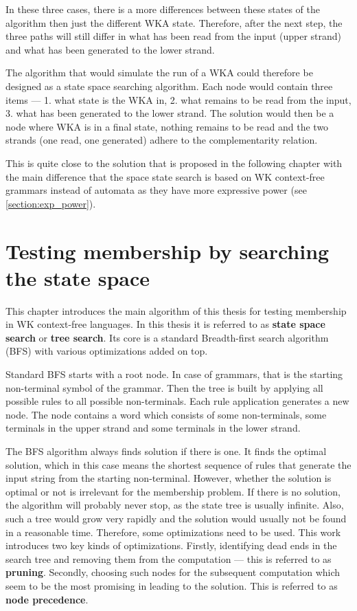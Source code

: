 In these three cases, there is a more differences between these states of the algorithm then just the different WKA state. Therefore, after the next step, the three paths will still differ in what has been read from the input (upper strand) and what has been generated to the lower strand.

The algorithm that would simulate the run of a WKA could therefore be designed as a state space searching algorithm. Each node would contain three items --- 1. what state is the WKA in, 2. what remains to be read from the input, 3. what has been generated to the lower strand. The solution would then be a node where WKA is in a final state, nothing remains to be read and the two strands (one read, one generated) adhere to the complementarity relation.

This is quite close to the solution that is proposed in the following chapter with the main difference that the space state search is based on WK context-free grammars instead of automata as they have more expressive power (see \ref{section:exp_power}).

\chapter{Testing membership by searching the state space} \label{chapter:parse_tree}
This chapter introduces the main algorithm of this thesis for testing membership in WK context-free languages. In this thesis it is referred to as \textbf{state space search} or \textbf{tree search}. Its core is a standard Breadth-first search algorithm (BFS) with various optimizations added on top.

Standard BFS starts with a root node. In case of grammars, that is the starting non-terminal symbol of the grammar. Then the tree is built by applying all possible rules to all possible non-terminals. Each rule application generates a new node. The node contains a word which consists of some non-terminals, some terminals in the upper strand and some terminals in the lower strand.

The BFS algorithm always finds solution if there is one. It finds the optimal solution, which in this case means the shortest sequence of rules that generate the input string from the starting non-terminal. However, whether the solution is optimal or not is irrelevant for the membership problem. If there is no solution, the algorithm will probably never stop, as the state tree is usually infinite. Also, such a tree would grow very rapidly and the solution would usually not be found in a reasonable time. Therefore, some optimizations need to be used. This work introduces two key kinds of optimizations. Firstly, identifying dead ends in the search tree and removing them from the computation --- this is referred to as \textbf{pruning}. Secondly, choosing such nodes for the subsequent computation which seem to be the most promising in leading to the solution. This is referred to as \textbf{node precedence}.

